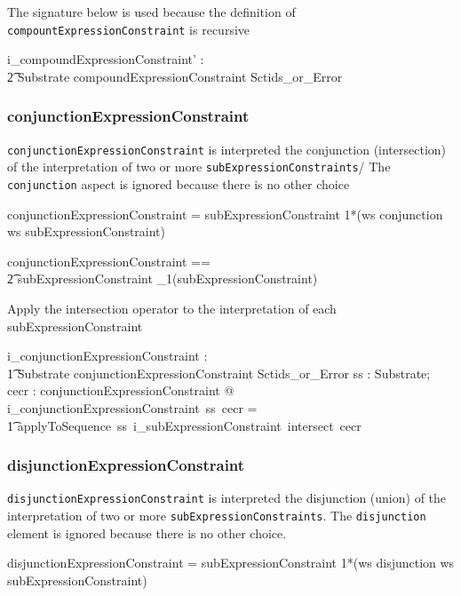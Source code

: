 \documentclass{article}
\def\spec#1{{\tt #1}}
\def\bnf#1{{\scriptsize {{#1}} }}
\begin{document}
The signature below is used because the definition of \spec{compountExpressionConstraint} is recursive
\begin{gendef}
   i\_compoundExpressionConstraint' : \\
\t2 Substrate \fun compoundExpressionConstraint \fun Sctids\_or\_Error
\end{gendef}


\subsubsection{conjunctionExpressionConstraint}
\spec{conjunctionExpressionConstraint} is interpreted the conjunction (intersection) of the interpretation of two or more
\spec{subExpressionConstraints}/  The \spec{conjunction} aspect is ignored because there is no other choice
\begin{framed}
\noindent
\bnf{conjunctionExpressionConstraint = subExpressionConstraint 1*(ws conjunction ws subExpressionConstraint)}
\end{framed}

\begin{zed}
conjunctionExpressionConstraint == \\
\t2 subExpressionConstraint \cross \seq_1(subExpressionConstraint)
\end{zed}

Apply the intersection operator to the interpretation of each  subExpressionConstraint

\begin{gendef}
    i\_conjunctionExpressionConstraint : \\
\t1 Substrate \fun conjunctionExpressionConstraint \fun Sctids\_or\_Error
\where
   \forall ss : Substrate;  cecr : conjunctionExpressionConstraint @ \\
i\_conjunctionExpressionConstraint~ss~cecr = \\
\t1 applyToSequence~ss~i\_subExpressionConstraint~intersect~cecr
\end{gendef}

\subsubsection{disjunctionExpressionConstraint}
\spec{disjunctionExpressionConstraint} is interpreted the disjunction (union) of the interpretation of two or more
\spec{subExpressionConstraints}. The \spec{disjunction} element is ignored because there is no other choice.
\begin{framed}
\noindent
\bnf{disjunctionExpressionConstraint = subExpressionConstraint 1*(ws disjunction ws subExpressionConstraint)}
\end{framed}
\end{document}
